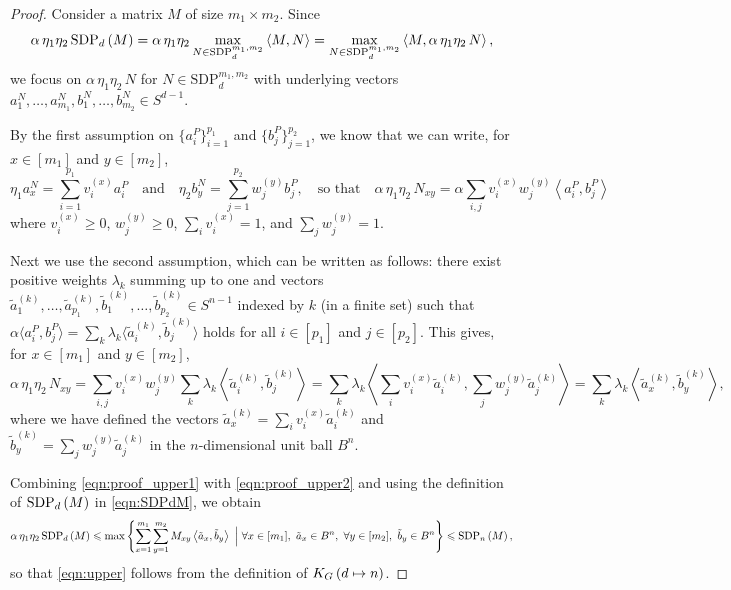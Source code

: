 \documentclass[10pt,a4paper]{amsart}
\newcommand\KG[2]{K_G\left({#1}\ifx#2\empty\else\mapsto\fi{#2}\right)}
\newcommand\cut[2]{\mathrm{SDP}_{#1}^{#2}}
\newcommand\sdp[2]{\mathrm{SDP}_{#1}\ifx#2\empty\else\left({#2}\right)\fi}
\newcommand{\innp}[2]{\left\langle{#1},{#2}\right\rangle}
\newcommand{\ta}{\tilde{a}}
\newcommand{\tb}{\tilde{b}}
\newcommand{\tinnp}[2]{\langle{#1},{#2}\rangle}
\renewcommand{\geq}{\geqslant}
\renewcommand{\leq}{\leqslant}
\begin{document}
\begin{proof}
  Consider a matrix $M$ of size $m_1\times m_2$.
  Since
  \begin{equation}
    \alpha\,\eta_1\eta_2\,\sdp{d}{M}=\alpha\,\eta_1\eta_2\max_{N\in\cut{d}{m_1,m_2}}\innp{M}{N}=\max_{N\in\cut{d}{m_1,m_2}}\innp{M}{\alpha\,\eta_1\eta_2\,N},
    \label{eqn:proof_upper1}
  \end{equation}
  we focus on $\alpha\,\eta_1\eta_2\,N$ for $N\in\cut{d}{m_1,m_2}$ with underlying vectors $a_1^N,\ldots,a_{m_1}^N,b_1^N,\ldots,b_{m_2}^N\in S^{d-1}$.

  By the first assumption on $\{a_i^P\}_{i=1}^{p_1}$ and $\{b_j^P\}_{j=1}^{p_2}$, we know that we can write, for $x\in[m_1]$ and $y\in[m_2]$,
  \begin{equation}
    \eta_1a_x^N=\sum_{i=1}^{p_1}v_i^{(x)}a_i^P\quad\text{and}\quad\eta_2b_y^N=\sum_{j=1}^{p_2}w_j^{(y)}b_j^P,\quad\text{so that}\quad\alpha\,\eta_1\eta_2\,N_{xy}=\alpha\sum_{i,j}v_i^{(x)}w_j^{(y)}\innp{a_i^P}{b_j^P}
  \end{equation}
  where $v_i^{(x)}\geq0$, $w_j^{(y)}\geq0$, $\sum_iv_i^{(x)}=1$, and $\sum_jw_j^{(y)}=1$.

  Next we use the second assumption, which can be written as follows: there exist positive weights $\lambda_k$ summing up to one and vectors $\ta_1^{(k)},\ldots,\ta_{p_1}^{(k)},\tb_1^{(k)},\ldots,\tb_{p_2}^{(k)}\in S^{n-1}$ indexed by $k$ (in a finite set) such that $\alpha\tinnp{a_i^P}{b_j^P}=\sum_k\lambda_k\tinnp{\ta_i^{(k)}}{\tb_j^{(k)}}$ holds for all $i\in[p_1]$ and $j\in[p_2]$.
  This gives, for $x\in[m_1]$ and $y\in[m_2]$,
  \begin{equation}
    \alpha\,\eta_1\eta_2\,N_{xy}=\sum_{i,j}v_i^{(x)}w_j^{(y)}\sum_k\lambda_k\innp{\ta_i^{(k)}}{\tb_j^{(k)}}=\sum_k\lambda_k\innp{\sum_iv_i^{(x)}\ta_i^{(k)}}{\sum_jw_j^{(y)}\ta_j^{(k)}}=\sum_k\lambda_k\innp{\ta_x^{(k)}}{\tb_y^{(k)}},
    \label{eqn:proof_upper2}
  \end{equation}
  where we have defined the vectors $\ta_x^{(k)}=\sum_iv_i^{(x)}\ta_i^{(k)}$ and $\tb_y^{(k)}=\sum_jw_j^{(y)}\ta_j^{(k)}$ in the $n$-dimensional unit ball $B^n$.

  Combining \cref{eqn:proof_upper1} with \cref{eqn:proof_upper2} and using the definition of $\sdp{d}{M}$ in \cref{eqn:SDPdM}, we obtain
  \begin{equation}
    \alpha\,\eta_1\eta_2\,\sdp{d}{M}\leq\max\left\{\sum_{x=1}^{m_1}\sum_{y=1}^{m_2} M_{xy}\innp{\ta_x}{\tb_y}~\Big|~\forall x\in[m_1],~\ta_x\in B^n,~\forall y\in[m_2],~\tb_y\in B^n\right\}\leq\sdp{n}{M},
  \end{equation}
  so that \cref{eqn:upper} follows from the definition of $\KG{d}{n}$.
\end{proof}
\end{document}
